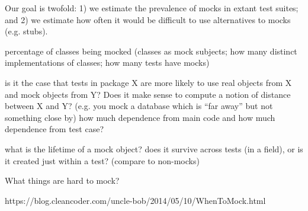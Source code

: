 Our goal is twofold: 1) we estimate the prevalence of mocks in extant test suites; and 2) we estimate how often it would be difficult to use alternatives to mocks (e.g. stubs).

percentage of classes being mocked (classes as mock subjects; how many distinct implementations of classes; how many tests have mocks)

is it the case that tests in package X are more likely to use real objects from X and mock objects from Y? Does it make sense to compute a notion of distance between X and Y? (e.g. you mock a database which is “far away” but not something close by)
how much dependence from main code and how much dependence from test case?

what is the lifetime of a mock object? does it survive across tests (in a field), or is it created just within a test? (compare to non-mocks)

What things are hard to mock?

https://blog.cleancoder.com/uncle-bob/2014/05/10/WhenToMock.html


